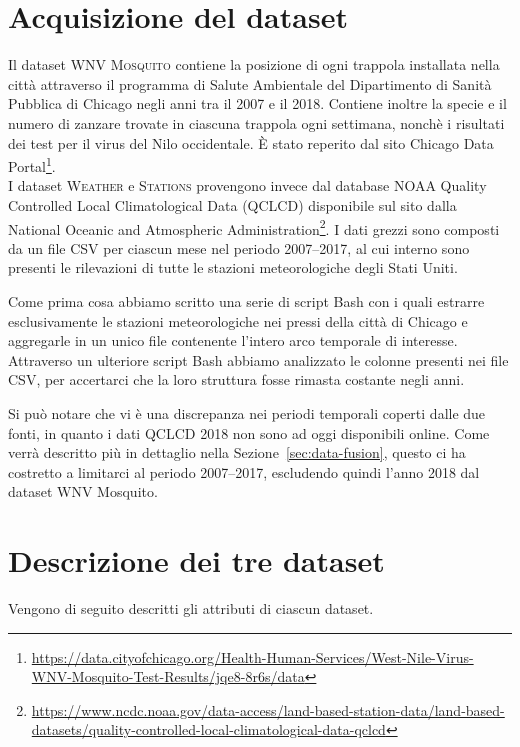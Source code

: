 \section{Acquisizione del dataset}
Il dataset \textsc{WNV Mosquito} contiene la posizione di ogni trappola 
installata nella città attraverso il programma di Salute Ambientale del 
Dipartimento di Sanità Pubblica di Chicago negli anni tra il 2007 e il 2018. 
Contiene inoltre la specie e il numero di zanzare trovate in ciascuna trappola 
ogni settimana, nonchè i risultati dei test per il virus del Nilo occidentale. 
È stato reperito dal sito Chicago Data 
Portal\footnote{\url{https://data.cityofchicago.org/Health-Human-Services/West-Nile-Virus-WNV-Mosquito-Test-Results/jqe8-8r6s/data}}.
\\

I dataset \textsc{Weather} e \textsc{Stations} provengono invece dal database 
NOAA Quality Controlled Local Climatological Data (QCLCD) disponibile sul sito 
dalla National Oceanic and Atmospheric 
Administration\footnote{\url{https://www.ncdc.noaa.gov/data-access/land-based-station-data/land-based-datasets/quality-controlled-local-climatological-data-qclcd}}.
I dati grezzi sono composti da un file CSV per ciascun mese nel periodo 
2007--2017, al cui interno sono presenti le rilevazioni di tutte le stazioni 
meteorologiche degli Stati Uniti.

Come prima cosa abbiamo scritto una serie di script Bash con i quali estrarre 
esclusivamente le stazioni meteorologiche nei pressi della città di Chicago e 
aggregarle in un unico file contenente l'intero arco temporale di interesse. 
Attraverso un ulteriore script Bash abbiamo analizzato le colonne presenti nei 
file CSV, per accertarci che la loro struttura fosse rimasta costante negli 
anni.

Si può notare che vi è una discrepanza nei periodi temporali coperti dalle due 
fonti, in quanto i dati QCLCD 2018 non sono ad oggi disponibili online. Come 
verrà descritto più in dettaglio nella Sezione~\ref{sec:data-fusion}, 
questo ci ha costretto a limitarci al periodo 2007--2017, escludendo quindi 
l'anno 2018 dal dataset WNV Mosquito.

\section{Descrizione dei tre dataset}
Vengono di seguito descritti gli attributi di ciascun dataset.

